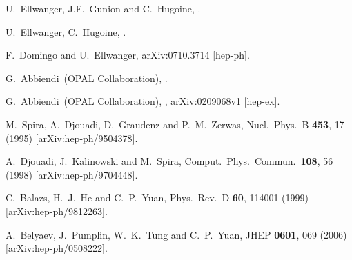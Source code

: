 \documentclass[aps,12pt,superscriptaddress,nofootinbib,floatfix,showpacs]{revtex4}
\begin{document}
\begin{thebibliography}{99}


% 

 U.~Ellwanger, J.F.~Gunion and C.~Hugoine,
.

 U.~Ellwanger, C.~Hugoine, .

 F.~Domingo and U.~Ellwanger, arXiv:0710.3714 [hep-ph].

 G.~Abbiendi~\etal (OPAL Collaboration),
.

 G.~Abbiendi~\etal (OPAL Collaboration),
, arXiv:0209068v1 [hep-ex].

  M.~Spira, A.~Djouadi, D.~Graudenz and P.~M.~Zerwas,
  Nucl.\ Phys.\  B {\bf 453}, 17 (1995)
  [arXiv:hep-ph/9504378].

  A.~Djouadi, J.~Kalinowski and M.~Spira,
  Comput.\ Phys.\ Commun.\  {\bf 108}, 56 (1998)
  [arXiv:hep-ph/9704448].

  C.~Balazs, H.~J.~He and C.~P.~Yuan,
  Phys.\ Rev.\  D {\bf 60}, 114001 (1999)
  [arXiv:hep-ph/9812263].
  
  
  A.~Belyaev, J.~Pumplin, W.~K.~Tung and C.~P.~Yuan,
  JHEP {\bf 0601}, 069 (2006)
  [arXiv:hep-ph/0508222].
  
%
%

    
\end{thebibliography}
\end{document}
